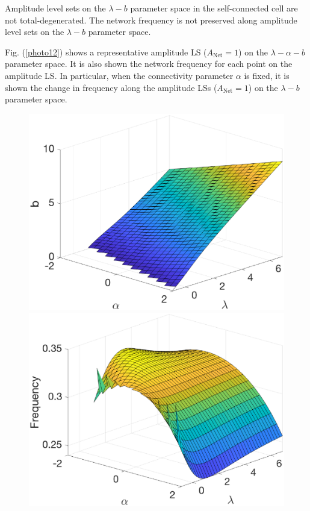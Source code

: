 \begin{Statement}
Amplitude level sets on the $\lambda-b$ parameter space in the self-connected cell are not total-degenerated. The network frequency is not preserved along amplitude level sets on the $\lambda-b$ parameter space.
\end{Statement}

Fig. (\ref{photo12}) shows a representative amplitude LS ($A_{\text{Net}} = 1$) on the $\lambda-\alpha-b$ parameter space. It is also shown the network frequency for each point on the amplitude LS. In particular, when the connectivity parameter $\alpha$ is fixed, it is shown the change in frequency along the amplitude LSs ($A_{\text{Net}} = 1$) on the $\lambda-b$ parameter space.

\begin{figure}[h]
\centering
  \begin{minipage}{0.45\linewidth}
  \centering
    \includegraphics[width=1\linewidth]{Images/photo12_1.eps} 
  \end{minipage} 
  \begin{minipage}{0.45\linewidth}
  \centering
    \includegraphics[width=1\linewidth]{Images/photo12_2.eps} 
  \end{minipage} 
 

\end{figure}
